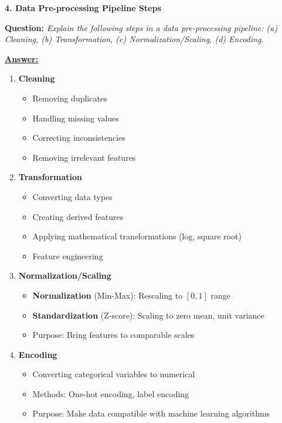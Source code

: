 \documentclass[11pt,a4paper]{article}
\newcommand{\questiontitle}[2]{%
    \vspace{0.4cm}%
    \noindent\textbf{\large\color{headerblue}#1. #2}\par\vspace{0.15cm}%
}
\newcommand{\qprompt}[1]{%
    \noindent\textbf{Question:} \textit{#1}\par\vspace{0.2cm}%
}
\newcommand{\answer}{\noindent\textbf{\underline{Answer:}}\par\vspace{0.15cm}}
\begin{document}
\questiontitle{4}{Data Pre-processing Pipeline Steps}
\qprompt{Explain the following steps in a data pre-processing pipeline: (a) Cleaning, (b) Transformation, (c) Normalization/Scaling, (d) Encoding.}
\answer
\begin{enumerate}[label=\textbf{(\alph*)}]
    \item \textbf{Cleaning}
    \begin{itemize}
        \item Removing duplicates
        \item Handling missing values
        \item Correcting inconsistencies
        \item Removing irrelevant features
    \end{itemize}

    \item \textbf{Transformation}
    \begin{itemize}
        \item Converting data types
        \item Creating derived features
        \item Applying mathematical transformations (log, square root)
        \item Feature engineering
    \end{itemize}

    \item \textbf{Normalization/Scaling}
    \begin{itemize}
        \item \textbf{Normalization} (Min-Max): Rescaling to $[0,1]$ range
        \item \textbf{Standardization} (Z-score): Scaling to zero mean, unit variance
        \item Purpose: Bring features to comparable scales
    \end{itemize}

    \item \textbf{Encoding}
    \begin{itemize}
        \item Converting categorical variables to numerical
        \item Methods: One-hot encoding, label encoding
        \item Purpose: Make data compatible with machine learning algorithms
    \end{itemize}
\end{enumerate}

\vspace{0.35cm}
\end{document}
